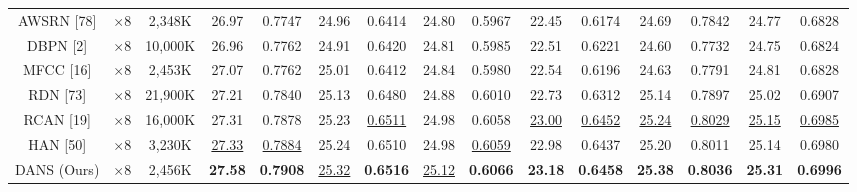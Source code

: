\documentclass{ieeeaccess}
\begin{document}
\begin{table}
\begin{tabular}{|c|c|c|cc|cc|cc|cc|cc|cc|}
AWSRN [78]& $\times8$&2,348K& \multicolumn{1}{c|}{26.97} &  0.7747 & \multicolumn{1}{c|}{24.96} & 0.6414&\multicolumn{1}{c|}{24.80} & 0.5967 & \multicolumn{1}{c|}{22.45  } &0.6174 & \multicolumn{1}{c|}{24.69 } &0.7842
&\multicolumn{1}{c|}{24.77  } &  0.6828       \\

DBPN [2]& $\times8$&10,000K& \multicolumn{1}{c|}{26.96} &  0.7762 & \multicolumn{1}{c|}{24.91} & 0.6420&\multicolumn{1}{c|}{24.81} & 0.5985 & \multicolumn{1}{c|}{22.51  } &0.6221 & \multicolumn{1}{c|}{24.60 } &0.7732
&\multicolumn{1}{c|}{24.75  } &  0.6824       \\

MFCC [16]& $\times8$&2,453K& \multicolumn{1}{c|}{27.07} &  0.7762 & \multicolumn{1}{c|}{25.01} & 0.6412&\multicolumn{1}{c|}{24.84} & 0.5980 & \multicolumn{1}{c|}{22.54  } &0.6196 & \multicolumn{1}{c|}{24.63 } &0.7791
&\multicolumn{1}{c|}{24.81  } &  0.6828       \\


RDN [73]& $\times8$&21,900K& \multicolumn{1}{c|}{27.21} &  0.7840 & \multicolumn{1}{c|}{25.13} & 0.6480&\multicolumn{1}{c|}{24.88} & 0.6010 & \multicolumn{1}{c|}{22.73  } &0.6312 & \multicolumn{1}{c|}{25.14 } &0.7897
&\multicolumn{1}{c|}{25.02  } &  0.6907       \\

RCAN [19]& $\times8$&16,000K& \multicolumn{1}{c|}{27.31} &  0.7878 & \multicolumn{1}{c|}{25.23} & {\color{blue}\underline{0.6511}}&\multicolumn{1}{c|}{24.98} & 0.6058 & \multicolumn{1}{c|}{\color{blue}\underline{23.00}} &{\color{blue}\underline{0.6452}} & \multicolumn{1}{c|}{\color{blue}\underline{25.24 }} &{\color{blue}\underline{0.8029}}
&\multicolumn{1}{c|}{\color{blue}\underline{25.15}} &  {\color{blue}\underline{0.6985}}       \\

HAN [50] & $\times8$&3,230K& \multicolumn{1}{c|}{\color{blue}\underline{27.33}} &{\color{blue}\underline{0.7884}}   & \multicolumn{1}{c|}{25.24} & 0.6510   &\multicolumn{1}{c|}{24.98} &{\color{blue}\underline{0.6059}}   & \multicolumn{1}{c|}{22.98} &{0.6437} & \multicolumn{1}{c|}{25.20}  &{0.8011} &\multicolumn{1}{c|}{25.14} &{0.6980} \\

DANS (Ours) & $\times8$ &2,456K& \multicolumn{1}{c|}{\color{red}\textbf{27.58}} &{\color{red}\textbf{0.7908}} & \multicolumn{1}{c|}{\color{blue}\underline{25.32}} &{\color{red}\textbf{0.6516}} & \multicolumn{1}{c|}{\color{blue}\underline{25.12}} &{\color{red}\textbf{0.6066}} & \multicolumn{1}{c|}{\color{red}\textbf{23.18}} &{\color{red}\textbf{0.6458}} & \multicolumn{1}{c|}{\color{red}\textbf{25.38}} &{\color{red}\textbf{0.8036}} &\multicolumn{1}{c|}{\color{red}\textbf{25.31}} &{\color{red}\textbf{0.6996}}  \\

\hline


\end{tabular}
\end{table}
\end{document}
